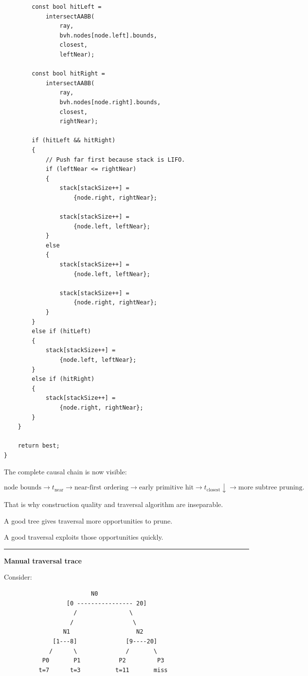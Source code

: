 \begin{verbatim}
        const bool hitLeft =
            intersectAABB(
                ray,
                bvh.nodes[node.left].bounds,
                closest,
                leftNear);

        const bool hitRight =
            intersectAABB(
                ray,
                bvh.nodes[node.right].bounds,
                closest,
                rightNear);

        if (hitLeft && hitRight)
        {
            // Push far first because stack is LIFO.
            if (leftNear <= rightNear)
            {
                stack[stackSize++] =
                    {node.right, rightNear};

                stack[stackSize++] =
                    {node.left, leftNear};
            }
            else
            {
                stack[stackSize++] =
                    {node.left, leftNear};

                stack[stackSize++] =
                    {node.right, rightNear};
            }
        }
        else if (hitLeft)
        {
            stack[stackSize++] =
                {node.left, leftNear};
        }
        else if (hitRight)
        {
            stack[stackSize++] =
                {node.right, rightNear};
        }
    }

    return best;
}
\end{verbatim}

The complete causal chain is now visible:

\[
\text{node bounds}
\rightarrow
t_{\text{near}}
\rightarrow
\text{near-first ordering}
\rightarrow
\text{early primitive hit}
\rightarrow
t_{\text{closest}}\downarrow
\rightarrow
\text{more subtree pruning}.
\]

That is why construction quality and traversal algorithm are inseparable.

A good tree gives traversal more opportunities to prune.

A good traversal exploits those opportunities quickly.

\begin{center}\rule{0.5\linewidth}{0.5pt}\end{center}

\textbf{Manual traversal trace}

Consider:

\begin{verbatim}
                         N0
                  [0 ---------------- 20]
                    /               \
                   /                 \
                 N1                   N2
              [1---8]              [9----20]
             /      \              /       \
           P0       P1           P2         P3
          t=7      t=3          t=11       miss
\end{verbatim}

